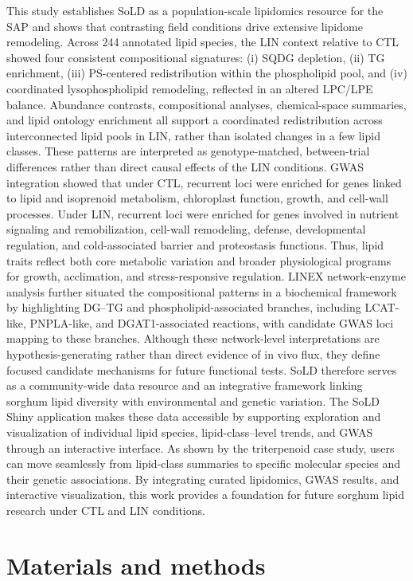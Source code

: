 \documentclass[9pt,twocolumn,twoside]{rilabRxiv}
\begin{document}
This study establishes SoLD as a population-scale lipidomics resource for the SAP and shows that contrasting field conditions drive extensive lipidome remodeling. Across 244 annotated lipid species, the LIN context relative to CTL showed four consistent compositional signatures: (i) SQDG depletion, (ii) TG enrichment, (iii) PS-centered redistribution within the phospholipid pool, and (iv) coordinated lysophospholipid remodeling, reflected in an altered LPC/LPE balance. Abundance contrasts, compositional analyses, chemical-space summaries, and lipid ontology enrichment all support a coordinated redistribution across interconnected lipid pools in LIN, rather than isolated changes in a few lipid classes. These patterns are interpreted as genotype-matched, between-trial differences rather than direct causal effects of the LIN conditions. GWAS integration showed that under CTL, recurrent loci were enriched for genes linked to lipid and isoprenoid metabolism, chloroplast function, growth, and cell-wall processes. Under LIN, recurrent loci were enriched for genes involved in nutrient signaling and remobilization, cell-wall remodeling, defense, developmental regulation, and cold-associated barrier and proteostasis functions. Thus, lipid traits reflect both core metabolic variation and broader physiological programs for growth, acclimation, and stress-responsive regulation. LINEX network-enzyme analysis further situated the compositional patterns in a biochemical framework by highlighting DG–TG and phospholipid-associated branches, including LCAT-like, PNPLA-like, and DGAT1-associated reactions, with candidate GWAS loci mapping to these branches. Although these network-level interpretations are hypothesis-generating rather than direct evidence of in vivo flux, they define focused candidate mechanisms for future functional tests. SoLD therefore serves as a community-wide data resource and an integrative framework linking sorghum lipid diversity with environmental and genetic variation. The SoLD Shiny application makes these data accessible by supporting exploration and visualization of individual lipid species, lipid-class–level trends, and GWAS through an interactive interface. As shown by the triterpenoid case study, users can move seamlessly from lipid-class summaries to specific molecular species and their genetic associations. By integrating curated lipidomics, GWAS results, and interactive visualization, this work provides a foundation for future sorghum lipid research under CTL and LIN conditions.


\section*{Materials and methods}
\end{document}

